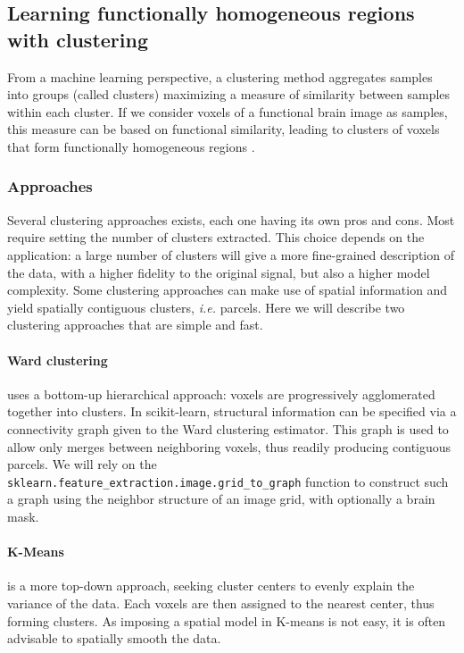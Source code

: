 \documentclass{frontiersSCNS} %
\begin{document}
\subsection{Learning functionally homogeneous regions with clustering}
\label{clustering}

From a machine learning perspective, a clustering method aggregates 
samples into groups (called clusters) maximizing a measure of similarity
between samples within each cluster. If we consider voxels of a functional brain image
as samples, this 
measure can be based on functional similarity, leading to clusters of voxels
that form functionally homogeneous regions \citep{thirion2006}.

\subsubsection{Approaches}

Several clustering approaches exists, each one having its own pros and
cons. Most require setting the number of clusters extracted. This choice
depends on the application: a large number of clusters will give a more
fine-grained description of the data, with a higher fidelity to the
original signal, but also a higher model complexity. Some clustering
approaches can make use of spatial information and yield
spatially contiguous clusters, \emph{i.e.} parcels. Here we will describe
two clustering approaches that are simple and fast.

\paragraph{Ward clustering} uses a bottom-up hierarchical approach:
voxels are progressively agglomerated together into clusters. In
scikit-learn, structural information can be specified via a connectivity
graph given to the Ward clustering estimator. This graph is used to allow
only merges between neighboring voxels, thus readily producing contiguous
parcels. We will rely on the {\tt
sklearn.feature\_extraction.image.grid\_to\_graph} function to
construct such a graph using the neighbor structure of an image grid,
with optionally a brain mask.

\paragraph{K-Means} is a more top-down approach, seeking cluster centers
to evenly explain the variance of the data. Each voxels are then assigned
to the nearest center, thus forming clusters. As imposing a spatial model
in K-means is not easy, it is often advisable to spatially smooth the
data.
\end{document}
